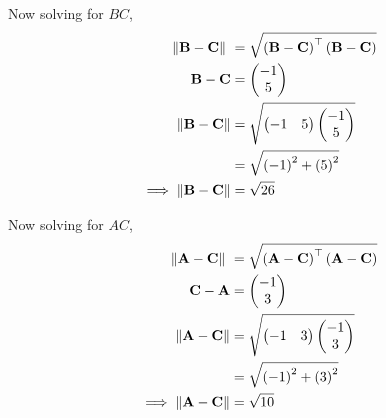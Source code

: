\documentclass[11pt]{book}
\begin{document}
\begin{enumerate}[label=\thesection.\arabic*.,ref=\thesection.\theenumi]
Now solving for $BC$,\\
\begin{align}
	\norm{\vec{B}-\vec{C}}\ &=  \sqrt{\brak{\vec{B}-\vec{C}}^{\top}\brak{\vec{B}-\vec{C}}} \\
\vec{B}-\vec{C} &= \myvec{-1\\5}\\
\norm{\vec{B}-\vec{C}} &= \sqrt{\myvec{-1 & 5}\myvec{-1\\5}}\\
&= \sqrt{\brak{-1}^2+\brak{5}^2}\\
\implies \norm{\vec{B}-\vec{C}} &= \sqrt{26}
\end{align}

Now solving for $AC$,\\
\begin{align}
	\norm{\vec{A}-\vec{C}}\ &=  \sqrt{\brak{\vec{A}-\vec{C}}^{\top}\brak{\vec{A}-\vec{C}}} \\
\vec{C}-\vec{A} &= \myvec{-1\\3}\\
\norm{\vec{A}-\vec{C}} &= \sqrt{\myvec{-1 & 3}\myvec{-1 \\ 3}}\\
&= \sqrt{\brak{-1}^2+\brak{3}^2}\\
\implies \norm{\vec{A}-\vec{C}}&=\sqrt{10}
\end{align}


\end{enumerate}
\end{document}
